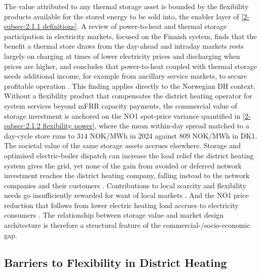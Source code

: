 The value attributed to any thermal storage asset is bounded by the flexibility products available for the stored energy to be sold into, the enabler layer of \autoref{2-subsec:2.1.1 definitions}. A review of power-to-heat and thermal storage participation in electricity markets, focused on the Finnish system, finds that the benefit a thermal store draws from the day-ahead and intraday markets rests largely on charging at times of lower electricity prices and discharging when prices are higher, and concludes that power-to-heat coupled with thermal storage needs additional income, for example from ancillary service markets, to secure profitable operation \cite{jaanto_thermal_2023}. This finding applies directly to the Norwegian DH context. Without a flexibility product that compensates the district heating operator for system services beyond mFRR capacity payments, the commercial value of storage investment is anchored on the NO1 spot-price variance quantified in \autoref{2-subsec:2.1.2 flexibility power}, where the mean within-day spread matched to a day-cycle store runs to $314$ NOK/MWh in 2024 against $809$ NOK/MWh in DK1. The societal value of the same storage assets accrues elsewhere. Storage and optimised electric-boiler dispatch can increase the load relief the district heating system gives the grid, yet none of the gain from avoided or deferred network investment reaches the district heating company, falling instead to the network companies and their customers \cite{Thema_fjernvarme_2024}. Contributions to local scarcity and flexibility needs go insufficiently rewarded for want of local markets \cite{Thema_fjernvarme_2024}. And the NO1 price reduction that follows from lower electric heating load accrues to electricity consumers \cite{Thema_fjernvarme_2024}. The relationship between storage value and market design architecture is therefore a structural feature of the commercial-/socio-economic gap.

\subsection{Barriers to Flexibility in District Heating}
\label{2-subsec:2.3 barriers}

